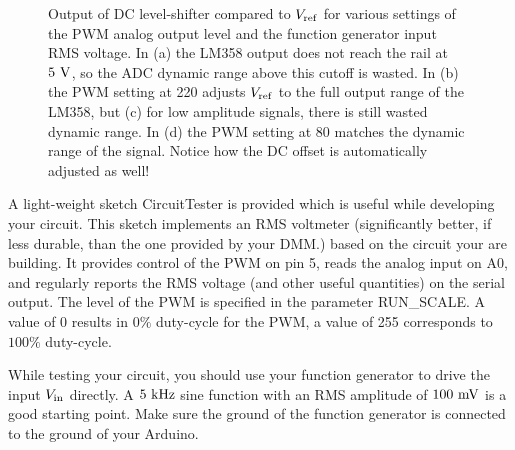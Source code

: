 \documentclass[12pt]{article}
\begin{document}
\begin{figure}[htbp]
\begin{center}
\begin{tabular}{cc}
\end{tabular}
\end{center}
\caption{\label{fig:pwmdemo}  
Output of DC level-shifter compared to $V_{\rm ref}$ for various settings of the PWM analog output level
 and the function generator input RMS voltage.  In (a) the LM358 output does not reach the rail at 
 $5~\rm V$, so the ADC dynamic range above this cutoff is wasted.  In (b) the PWM setting at 220 adjusts $V_{\rm ref}$ to the full output range of the LM358, but (c) for low amplitude signals,
there is still wasted dynamic range.  In (d) the PWM setting at 80 matches the dynamic range of the signal.  Notice how the DC offset is automatically adjusted as well!
}
\end{figure}


A light-weight sketch {\rm CircuitTester} is provided which is useful while developing your circuit.  This sketch implements an RMS voltmeter (significantly better, if less durable, than the one provided by your DMM.) based on the circuit your are building.  It provides control of the PWM on pin 5, reads the analog input on A0, and regularly reports the RMS voltage (and other useful quantities) on the serial output.
The level of the PWM is specified in the parameter {\rm RUN\_SCALE}.  A value of 0 results in $0\%$ duty-cycle for the PWM, a value of 255 corresponds to $100\%$ duty-cycle.

While testing your circuit, you should use your function generator to drive the input $V_{\rm in}$ directly.  A $5~\rm kHz$ sine function with an RMS amplitude of $100~\rm mV$ is a good starting point.  Make sure the ground of the function generator is connected to the ground of your Arduino.
\end{document}
